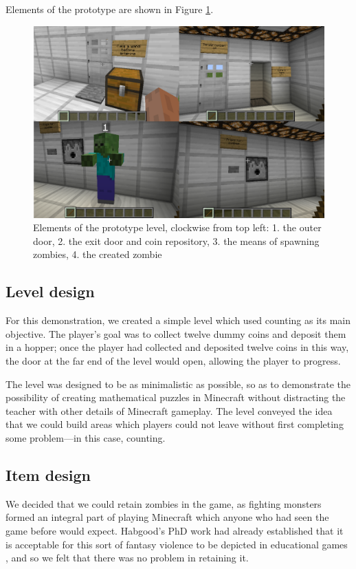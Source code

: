 Elements of the prototype are shown in Figure \ref{fig:prototype}.

\begin{figure}
\caption{Elements of the prototype level, clockwise from top left:
            1. the outer door, 2. the exit door and coin repository,
            3. the means of spawning zombies, 4. the created zombie}
\label{fig:prototype}
\centering
\includegraphics[width=13.5cm]{prototype-ssot-composite}
\end{figure}

\subsection{Level design}
For this demonstration, we created a simple level which used counting
as its main objective. The player's goal was to collect twelve
dummy coins and deposit them in a hopper; once the player had collected
and deposited twelve coins in this way, the door at the far end of the level
would open, allowing the player to progress.

The level was designed to be as minimalistic as possible, so as to 
demonstrate the possibility of creating mathematical puzzles in Minecraft
without distracting the teacher with other details of Minecraft gameplay.
The level conveyed the idea that we could build areas which players could not 
leave without first completing some problem---in this case, counting.

\subsection{Item design}
We decided that we could retain zombies in the game, as fighting monsters
formed an integral part of playing Minecraft which anyone who had seen the
game before would expect. Habgood's PhD work had already established that
it is acceptable for this sort of fantasy violence to be depicted in
educational games \cite{habgood07}, and so we felt that there was no
problem in retaining it.

